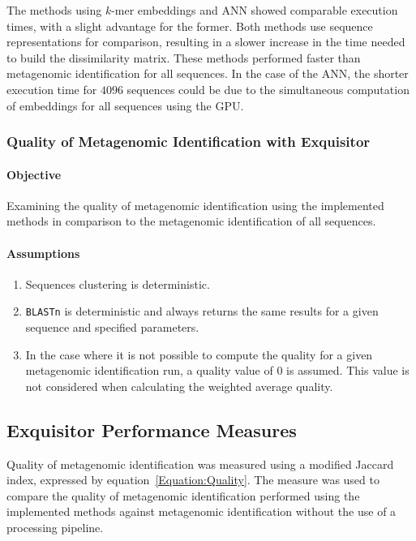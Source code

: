 \documentclass[pdflatex,sn-vancouver-num]{sn-jnl}%
\begin{document}
                The methods using $k$-mer embeddings and ANN showed comparable execution times, with a slight advantage for the former. Both methods use sequence representations for comparison, resulting in a slower increase in the time needed to build the dissimilarity matrix. These methods performed faster than metagenomic identification for all sequences. In the case of the ANN, the shorter execution time for $4096$ sequences could be due to the simultaneous computation of embeddings for all sequences using the GPU.

            \subsubsection{Quality of Metagenomic Identification with Exquisitor}
                \paragraph{Objective}
                Examining the quality of metagenomic identification using the implemented methods in comparison to the metagenomic identification of all sequences.

                \paragraph{Assumptions}
                \begin{enumerate}
                    \item {
                        Sequences clustering is deterministic.
                    }
                    \item {
                        \texttt{BLASTn} is deterministic and always returns the same results for a given sequence and specified parameters.
                    }
                    \item {
                        In the case where it is not possible to compute the quality for a given metagenomic identification run, a quality value of $0$ is assumed. This value is not considered when calculating the weighted average quality.
                    }
                  \end{enumerate}


        \subsection{Exquisitor Performance Measures}
            Quality of metagenomic identification was measured using a modified Jaccard index, expressed by equation~\ref{Equation:Quality}. The measure was used to compare the quality of metagenomic identification performed using the implemented methods against metagenomic identification without the use of a processing pipeline.
\end{document}
